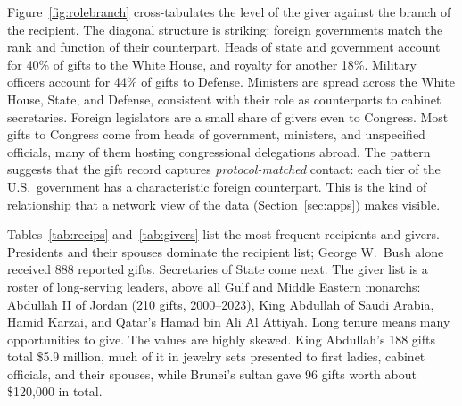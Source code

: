 \documentclass[11pt]{article}
\makeatletter
\renewcommand\subsection{\@startsection{subsection}{2}{\z@}{-2.5ex plus -1ex minus -.2ex}{1ex plus .2ex}{\normalfont\normalsize\bfseries\MakeUppercase}}
\makeatother
\begin{document}
Figure~\ref{fig:rolebranch} cross-tabulates the level of the giver against the branch of the recipient. The diagonal structure is striking: foreign governments match the rank and function of their counterpart. Heads of state and government account for 40\% of gifts to the White House, and royalty for another 18\%. Military officers account for 44\% of gifts to Defense. Ministers are spread across the White House, State, and Defense, consistent with their role as counterparts to cabinet secretaries. Foreign legislators are a small share of givers even to Congress. Most gifts to Congress come from heads of government, ministers, and unspecified officials, many of them hosting congressional delegations abroad. The pattern suggests that the gift record captures \emph{protocol-matched} contact: each tier of the U.S.\ government has a characteristic foreign counterpart. This is the kind of relationship that a network view of the data (Section~\ref{sec:apps}) makes visible.

\subsection{Individuals}

\begin{table}[t]
\centering\footnotesize
\caption{Top recipients by number of gifts (Wikidata-linked). Value is the nominal sum of estimated values. Branch lists every branch under which the person received gifts.}\label{tab:recips}

\end{table}

\begin{table}[t]
\centering\footnotesize
\caption{Top givers by number of gifts (Wikidata-linked).}\label{tab:givers}

\end{table}

Tables~\ref{tab:recips} and~\ref{tab:givers} list the most frequent recipients and givers. Presidents and their spouses dominate the recipient list; George W.\ Bush alone received 888 reported gifts. Secretaries of State come next. The giver list is a roster of long-serving leaders, above all Gulf and Middle Eastern monarchs: Abdullah II of Jordan (210 gifts, 2000--2023), King Abdullah of Saudi Arabia, Hamid Karzai, and Qatar's Hamad bin Ali Al Attiyah. Long tenure means many opportunities to give. The values are highly skewed. King Abdullah's 188 gifts total \$5.9 million, much of it in jewelry sets presented to first ladies, cabinet officials, and their spouses, while Brunei's sultan gave 96 gifts worth about \$120,000 in total.
\end{document}
